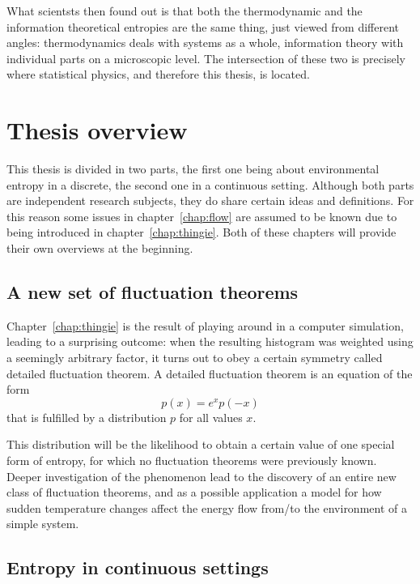 What scientsts then found out is that both the thermodynamic and the information theoretical entropies are the same thing, just viewed from different angles: thermodynamics deals with systems as a whole, information theory with individual parts on a microscopic level. The intersection of these two is precisely where statistical physics, and therefore this thesis, is located.



\section{Thesis overview}

This thesis is divided in two parts, the first one being about environmental entropy in a discrete, the second one in a continuous setting. Although both parts are independent research subjects, they do share certain ideas and definitions. For this reason some issues in chapter~\ref{chap:flow} are assumed to be known due to being introduced in chapter~\ref{chap:thingie}. Both of these chapters will provide their own overviews at the beginning.


\subsection{A new set of fluctuation theorems}

Chapter~\ref{chap:thingie} is the result of playing around in a computer simulation, leading to a surprising outcome: when the resulting histogram was weighted using a seemingly arbitrary factor, it turns out to obey a certain symmetry called detailed fluctuation theorem. A detailed fluctuation theorem is an equation of the form
%
\begin{equation}
	p(x) = e^{x}p(-x)
\end{equation}
%
that is fulfilled by a distribution \(p\) for all values \(x\).

This distribution will be the likelihood to obtain a certain value of one special form of entropy, for which no fluctuation theorems were previously known. Deeper investigation of the phenomenon lead to the discovery of an entire new class of fluctuation theorems, and as a possible application a model for how sudden temperature changes affect the energy flow from/to the environment of a simple system.





\subsection{Entropy in continuous settings}

